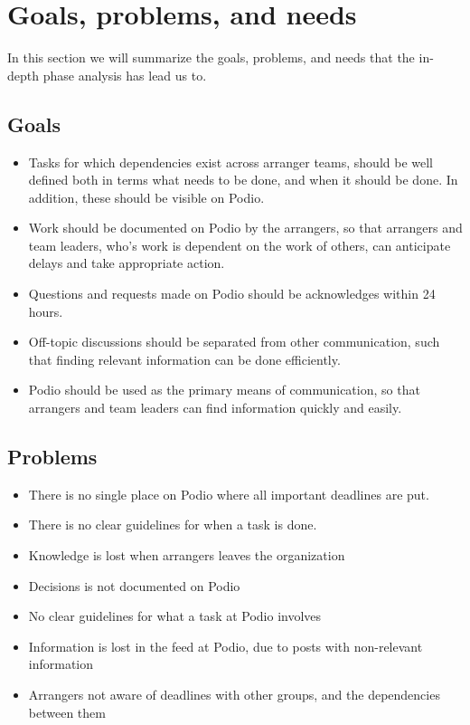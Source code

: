 \section{Goals, problems, and needs}
\label{sec:goprne}
In this section we will summarize the goals, problems, and needs that the
in-depth phase analysis has lead us to.

\subsection{Goals}
\label{subsec:goals}
\begin{itemize}
    \item Tasks for which dependencies exist across arranger teams, should be well defined both in terms what needs to be done, and when it should be done. In addition, these should be visible on Podio.
    \item Work should be documented on Podio by the arrangers, so that arrangers and team leaders, who's work is dependent on the work of others, can anticipate delays and take appropriate action.
    \item Questions and requests made on Podio should be acknowledges within 24 hours.
    \item Off-topic discussions should be separated from other communication, such that finding relevant information can be done efficiently.
    \item Podio should be used as the primary means of communication, so that arrangers and team leaders can find information quickly and easily.
\end{itemize}

\subsection{Problems}
\label{subsec:problems}
\begin{itemize}
    \item There is no single place on Podio where all important deadlines are put.
    \item There is no clear guidelines for when a task is done.
	 \item Knowledge is lost when arrangers leaves the organization
	 \item Decisions is not documented on Podio
	 \item No clear guidelines for what a task at Podio involves
	 \item Information is lost in the feed at Podio, due to posts with non-relevant information
	 \item Arrangers not aware of deadlines with other groups, and the dependencies between them
	 
\end{itemize}

